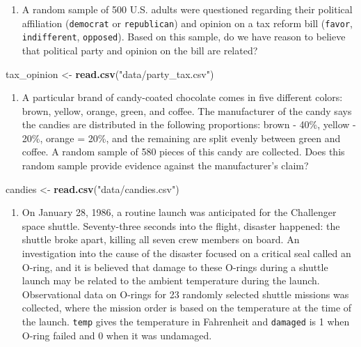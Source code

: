\documentclass[]{article}
\newenvironment{Shaded}{\begin{snugshade}}{\end{snugshade}}
\newcommand{\KeywordTok}[1]{\textcolor[rgb]{0.13,0.29,0.53}{\textbf{{#1}}}}
\newcommand{\StringTok}[1]{\textcolor[rgb]{0.31,0.60,0.02}{{#1}}}
\newcommand{\NormalTok}[1]{{#1}}
\providecommand{\tightlist}{%
  \setlength{\itemsep}{0pt}\setlength{\parskip}{0pt}}
\begin{document}
\begin{enumerate}
\def\labelenumi{\arabic{enumi}.}
\setcounter{enumi}{4}
\tightlist
\item
  A random sample of 500 U.S. adults were questioned regarding their
  political affiliation (\texttt{democrat} or \texttt{republican}) and
  opinion on a tax reform bill (\texttt{favor}, \texttt{indifferent},
  \texttt{opposed}). Based on this sample, do we have reason to believe
  that political party and opinion on the bill are related?
\end{enumerate}

\begin{Shaded}
\begin{Highlighting}[]
\NormalTok{tax_opinion <-}\StringTok{ }\KeywordTok{read.csv}\NormalTok{(}\StringTok{"data/party_tax.csv"}\NormalTok{)}
\end{Highlighting}
\end{Shaded}

\begin{enumerate}
\def\labelenumi{\arabic{enumi}.}
\setcounter{enumi}{5}
\tightlist
\item
  A particular brand of candy-coated chocolate comes in five different
  colors: brown, yellow, orange, green, and coffee. The manufacturer of
  the candy says the candies are distributed in the following
  proportions: brown - 40\%, yellow - 20\%, orange = 20\%, and the
  remaining are split evenly between green and coffee. A random sample
  of 580 pieces of this candy are collected. Does this random sample
  provide evidence against the manufacturer's claim?
\end{enumerate}

\begin{Shaded}
\begin{Highlighting}[]
\NormalTok{candies <-}\StringTok{ }\KeywordTok{read.csv}\NormalTok{(}\StringTok{"data/candies.csv"}\NormalTok{)}
\end{Highlighting}
\end{Shaded}

\begin{enumerate}
\def\labelenumi{\arabic{enumi}.}
\setcounter{enumi}{9}
\tightlist
\item
  On January 28, 1986, a routine launch was anticipated for the
  Challenger space shuttle. Seventy-three seconds into the flight,
  disaster happened: the shuttle broke apart, killing all seven crew
  members on board. An investigation into the cause of the disaster
  focused on a critical seal called an O-ring, and it is believed that
  damage to these O-rings during a shuttle launch may be related to the
  ambient temperature during the launch. Observational data on O-rings
  for 23 randomly selected shuttle missions was collected, where the
  mission order is based on the temperature at the time of the launch.
  \texttt{temp} gives the temperature in Fahrenheit and \texttt{damaged}
  is 1 when O-ring failed and 0 when it was undamaged.
\end{enumerate}
\end{document}
